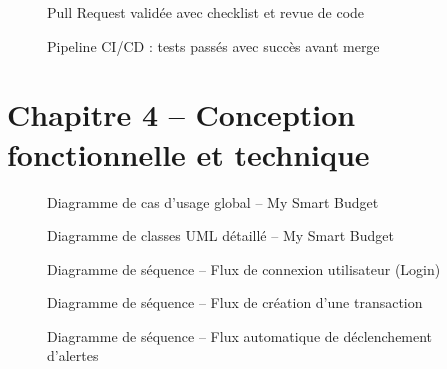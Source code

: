 \begin{figure}[H]
    \centering
    \caption{Pull Request validée avec checklist et revue de code}
    \label{fig:pr-ann}
\end{figure}

\begin{figure}[H]
    \centering
    \caption{Pipeline CI/CD : tests passés avec succès avant merge}
    \label{fig:ci_cd-ann}
\end{figure}

\section{Chapitre 4 -- Conception fonctionnelle et technique}

\begin{figure}[H]
    \centering
    \caption{Diagramme de cas d'usage global -- My Smart Budget}
    \label{fig:usage_global-ann}
\end{figure}

\begin{figure}[H]
    \centering
    \caption{Diagramme de classes UML détaillé -- My Smart Budget}
    \label{fig:class-diagram-ann}
\end{figure}

\begin{figure}[H]
    \centering
    \caption{Diagramme de séquence -- Flux de connexion utilisateur (Login)}
    \label{fig:seq-auth-ann}
\end{figure}

\begin{figure}[H]
    \centering
    \caption{Diagramme de séquence -- Flux de création d'une transaction}
    \label{fig:seq-transaction-ann}
\end{figure}

\begin{figure}[H]
    \centering
    \caption{Diagramme de séquence -- Flux automatique de déclenchement d'alertes}
    \label{fig:seq-alert-ann}
\end{figure}

